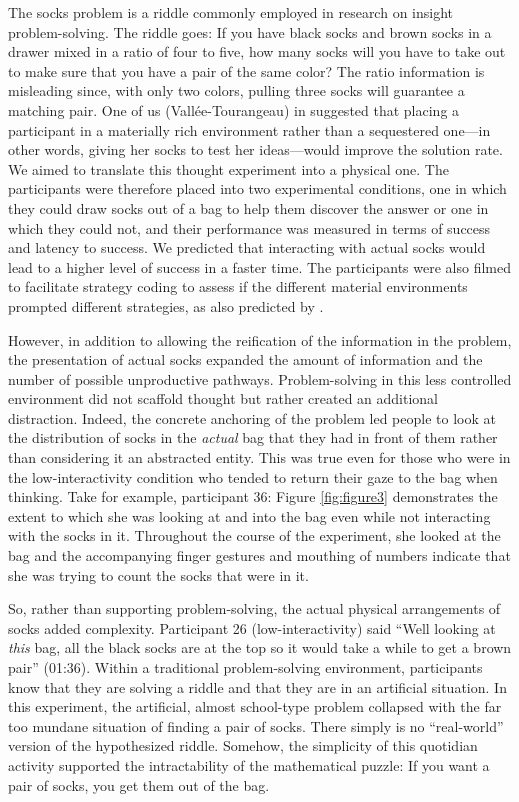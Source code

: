 \documentclass[twocolumn, issue, empirical, authordate,drafn]{jote-new-article}
\begin{document}
\begin{originalPurpose}

The socks problem is a riddle commonly employed in research on insight problem-solving. The riddle goes: If you have black socks and brown socks in a drawer mixed in a ratio of four to five, how many socks will you have to take out to make sure that you have a pair of the same color? The ratio information is misleading since, with only two colors, pulling three socks will guarantee a matching pair. One of us (Vallée-Tourangeau) in \textcite{Vallee-Tourangeau2020} suggested that placing a participant in a materially rich environment rather than a sequestered one---in other words, giving her socks to test her ideas---would improve the solution rate. We aimed to translate this thought experiment into a physical one. The participants were therefore placed into two experimental conditions, one in which they could draw socks out of a bag to help them discover the answer or one in which they could not, and their performance was measured in terms of success and latency to success. We predicted that interacting with actual socks would lead to a higher level of success in a faster time. The participants were also filmed to facilitate strategy coding to assess if the different material environments prompted different strategies, as also predicted by \textcite{Vallee-Tourangeau2020}. 
\end{originalPurpose}

However, in addition to allowing the reification of the information in the problem, the presentation of actual socks expanded the amount of information and the number of possible unproductive pathways. Problem-solving in this less controlled environment did not scaffold thought but rather created an additional distraction. Indeed, the concrete anchoring of the problem led people to look at the distribution of socks in the \emph{actual} bag that they had in front of them rather than considering it an abstracted entity. This was true even for those who were in the low-interactivity condition who tended to return their gaze to the bag when thinking. Take for example, participant 36: Figure \ref{fig:figure3} demonstrates the extent to which she was looking at and into the bag even while not interacting with the socks in it. Throughout the course of the experiment, she looked at the bag and the accompanying finger gestures and mouthing of numbers indicate that she was trying to count the socks that were in it. 

So, rather than supporting problem-solving, the actual physical arrangements of socks added complexity. Participant 26 (low-interactivity) said ``Well looking at \emph{this} bag, all the black socks are at the top so it would take a while to get a brown pair'' (01:36). Within a traditional problem-solving environment, participants know that they are solving a riddle and that they are in an artificial situation. In this experiment, the artificial, almost school-type problem collapsed with the far too mundane situation of finding a pair of socks. There simply is no ``real-world'' version of the hypothesized riddle. Somehow, the simplicity of this quotidian activity supported the intractability of the mathematical puzzle: If you want a pair of socks, you get them out of the bag. 
\end{document}
